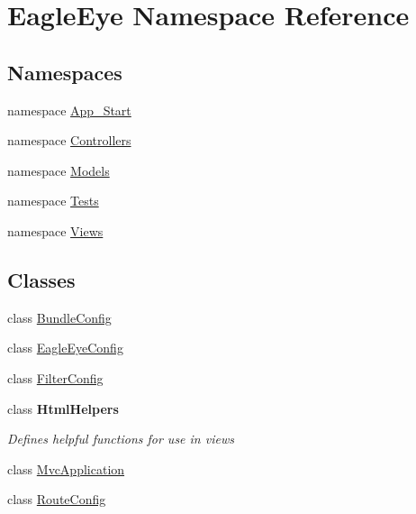 \hypertarget{namespace_eagle_eye}{}\section{Eagle\+Eye Namespace Reference}
\label{namespace_eagle_eye}
\subsection*{Namespaces}
\begin{DoxyCompactItemize}
\item 
namespace \mbox{\hyperlink{namespace_eagle_eye_1_1_app___start}{App\+\_\+\+Start}}
\item 
namespace \mbox{\hyperlink{namespace_eagle_eye_1_1_controllers}{Controllers}}
\item 
namespace \mbox{\hyperlink{namespace_eagle_eye_1_1_models}{Models}}
\item 
namespace \mbox{\hyperlink{namespace_eagle_eye_1_1_tests}{Tests}}
\item 
namespace \mbox{\hyperlink{namespace_eagle_eye_1_1_views}{Views}}
\end{DoxyCompactItemize}
\subsection*{Classes}
\begin{DoxyCompactItemize}
\item 
class \mbox{\hyperlink{class_eagle_eye_1_1_bundle_config}{Bundle\+Config}}
\item 
class \mbox{\hyperlink{class_eagle_eye_1_1_eagle_eye_config}{Eagle\+Eye\+Config}}
\item 
class \mbox{\hyperlink{class_eagle_eye_1_1_filter_config}{Filter\+Config}}
\item 
class {\bfseries Html\+Helpers}
\begin{DoxyCompactList}\small\item\em Defines helpful functions for use in views \end{DoxyCompactList}\item 
class \mbox{\hyperlink{class_eagle_eye_1_1_mvc_application}{Mvc\+Application}}
\item 
class \mbox{\hyperlink{class_eagle_eye_1_1_route_config}{Route\+Config}}
\end{DoxyCompactItemize}
